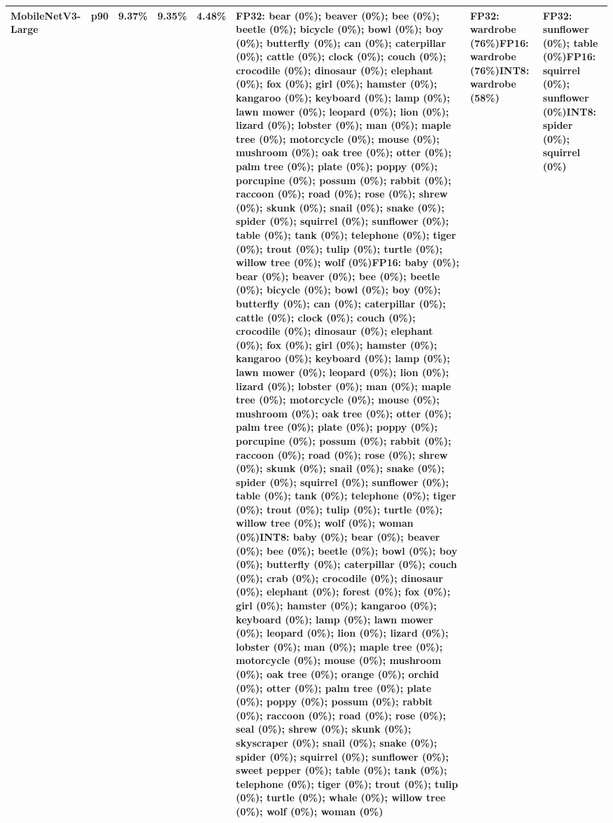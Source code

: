 \begin{longtable}{p{2.8cm} r r r r p{5.0cm} p{4.2cm} p{4.2cm}}
MobileNetV3-Large & p90 & 9.37\% & 9.35\% & 4.48\% & FP32: bear (0\%); beaver (0\%); bee (0\%); beetle (0\%); bicycle (0\%); bowl (0\%); boy (0\%); butterfly (0\%); can (0\%); caterpillar (0\%); cattle (0\%); clock (0\%); couch (0\%); crocodile (0\%); dinosaur (0\%); elephant (0\%); fox (0\%); girl (0\%); hamster (0\%); kangaroo (0\%); keyboard (0\%); lamp (0\%); lawn mower (0\%); leopard (0\%); lion (0\%); lizard (0\%); lobster (0\%); man (0\%); maple tree (0\%); motorcycle (0\%); mouse (0\%); mushroom (0\%); oak tree (0\%); otter (0\%); palm tree (0\%); plate (0\%); poppy (0\%); porcupine (0\%); possum (0\%); rabbit (0\%); raccoon (0\%); road (0\%); rose (0\%); shrew (0\%); skunk (0\%); snail (0\%); snake (0\%); spider (0\%); squirrel (0\%); sunflower (0\%); table (0\%); tank (0\%); telephone (0\%); tiger (0\%); trout (0\%); tulip (0\%); turtle (0\%); willow tree (0\%); wolf (0\%)\newline FP16: baby (0\%); bear (0\%); beaver (0\%); bee (0\%); beetle (0\%); bicycle (0\%); bowl (0\%); boy (0\%); butterfly (0\%); can (0\%); caterpillar (0\%); cattle (0\%); clock (0\%); couch (0\%); crocodile (0\%); dinosaur (0\%); elephant (0\%); fox (0\%); girl (0\%); hamster (0\%); kangaroo (0\%); keyboard (0\%); lamp (0\%); lawn mower (0\%); leopard (0\%); lion (0\%); lizard (0\%); lobster (0\%); man (0\%); maple tree (0\%); motorcycle (0\%); mouse (0\%); mushroom (0\%); oak tree (0\%); otter (0\%); palm tree (0\%); plate (0\%); poppy (0\%); porcupine (0\%); possum (0\%); rabbit (0\%); raccoon (0\%); road (0\%); rose (0\%); shrew (0\%); skunk (0\%); snail (0\%); snake (0\%); spider (0\%); squirrel (0\%); sunflower (0\%); table (0\%); tank (0\%); telephone (0\%); tiger (0\%); trout (0\%); tulip (0\%); turtle (0\%); willow tree (0\%); wolf (0\%); woman (0\%)\newline INT8: baby (0\%); bear (0\%); beaver (0\%); bee (0\%); beetle (0\%); bowl (0\%); boy (0\%); butterfly (0\%); caterpillar (0\%); couch (0\%); crab (0\%); crocodile (0\%); dinosaur (0\%); elephant (0\%); forest (0\%); fox (0\%); girl (0\%); hamster (0\%); kangaroo (0\%); keyboard (0\%); lamp (0\%); lawn mower (0\%); leopard (0\%); lion (0\%); lizard (0\%); lobster (0\%); man (0\%); maple tree (0\%); motorcycle (0\%); mouse (0\%); mushroom (0\%); oak tree (0\%); orange (0\%); orchid (0\%); otter (0\%); palm tree (0\%); plate (0\%); poppy (0\%); possum (0\%); rabbit (0\%); raccoon (0\%); road (0\%); rose (0\%); seal (0\%); shrew (0\%); skunk (0\%); skyscraper (0\%); snail (0\%); snake (0\%); spider (0\%); squirrel (0\%); sunflower (0\%); sweet pepper (0\%); table (0\%); tank (0\%); telephone (0\%); tiger (0\%); trout (0\%); tulip (0\%); turtle (0\%); whale (0\%); willow tree (0\%); wolf (0\%); woman (0\%) & FP32: wardrobe (76\%)\newline FP16: wardrobe (76\%)\newline INT8: wardrobe (58\%) & FP32: sunflower (0\%); table (0\%)\newline FP16: squirrel (0\%); sunflower (0\%)\newline INT8: spider (0\%); squirrel (0\%) \\ \hline

\end{longtable}
